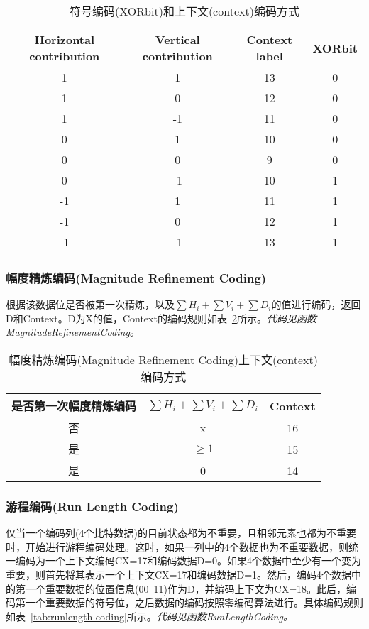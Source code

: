 \begin{table}[h]
\begin{center}
\begin{tabular}{|c|c|c|c|}
\hline
\textbf{Horizontal contribution} & \textbf{Vertical contribution} & \textbf{Context label} & \textbf{XORbit}\\
\hline
1 & 1 & 13 & 0\\
\hline
1 & 0 & 12 & 0\\
\hline
1 & -1 & 11 & 0\\
\hline
0 & 1 & 10 & 0\\
\hline
0 & 0 & 9 & 0\\
\hline
0 & -1 & 10 & 1\\
\hline
-1 & 1 & 11 & 1\\
\hline
-1 & 0 & 12 & 1\\
\hline
-1 & -1 & 13 & 1\\
\hline
\end{tabular}
\end{center}
\caption{符号编码(XORbit)和上下文(context)编码方式}
\label{tab:sign coding}
\end{table}

\subsubsection{幅度精炼编码(Magnitude Refinement Coding)}
根据该数据位是否被第一次精炼，以及$\sum H_i +  \sum V_i + \sum D_i$的值进行编码，返回D和Context。D为X的值，Context的编码规则如表{~\ref{tab:magnitude coding}}所示。\textit{代码见函数MagnitudeRefinementCoding。}

\begin{table}[h]
\begin{center}
\begin{tabular}{|c|c|c|}
\hline
\textbf{是否第一次幅度精炼编码}&\textbf{$\sum H_i +  \sum V_i + \sum D_i$}&\textbf{Context}\\
\hline
否&x&16\\
\hline
是&$\geq 1$ &15\\
\hline
是& 0 &14\\
\hline
\end{tabular}
\end{center}
\caption{幅度精炼编码(Magnitude Refinement Coding)上下文(context)编码方式}
\label{tab:magnitude coding}
\end{table}

\subsubsection{游程编码(Run Length Coding)}
仅当一个编码列(4个比特数据)的目前状态都为不重要，且相邻元素也都为不重要时，开始进行游程编码处理。这时，如果一列中的4个数据也为不重要数据，则统一编码为一个上下文编码CX=17和编码数据D=0。如果4个数据中至少有一个变为重要，则首先将其表示一个上下文CX=17和编码数据D=1。然后，编码4个数据中的第一个重要数据的位置信息(00~11)作为D，并编码上下文为CX=18。此后，编码第一个重要数据的符号位，之后数据的编码按照零编码算法进行。具体编码规则如表{~\ref{tab:runlength coding}}所示。\textit{代码见函数RunLengthCoding。}


